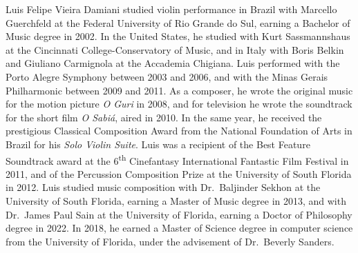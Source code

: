 Luis Felipe Vieira Damiani studied violin performance in Brazil with Marcello Guerchfeld at the Federal University of Rio Grande do Sul, earning a Bachelor of Music degree in 2002. In the United States, he studied with Kurt Sassmannshaus at the Cincinnati College-Conservatory of Music, and in Italy with Boris Belkin and Giuliano Carmignola at the Accademia Chigiana. Luis performed with the Porto Alegre Symphony between 2003 and 2006, and with the Minas Gerais Philharmonic between 2009 and 2011. As a composer, he wrote the original music for the motion picture \emph{O Guri} in 2008, and for television he wrote the soundtrack for the short film \emph{O Sabi\'a}, aired in 2010. In the same year, he received the prestigious Classical Composition Award from the National Foundation of Arts in Brazil for his \emph{Solo Violin Suite}. Luis was a recipient of the Best Feature Soundtrack award at the 6\textsuperscript{th} Cinefantasy International Fantastic Film Festival in 2011, and of the Percussion Composition Prize at the University of South Florida in 2012. Luis studied music composition with Dr.~Baljinder Sekhon at the University of South Florida, earning a Master of Music degree in 2013, and with Dr.~James Paul Sain at the University of Florida, earning a Doctor of Philosophy degree in 2022. In 2018, he earned a Master of Science degree in computer science from the University of Florida, under the advisement of Dr.~Beverly Sanders.
